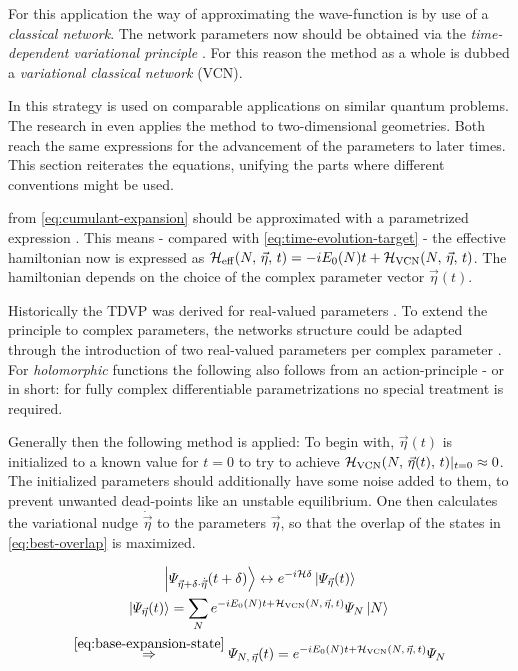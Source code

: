 For this application the way of approximating the wave-function is by use of a \emph{classical network}. 
The network parameters now should be obtained via the \emph{time-dependent variational principle} \cite{originalDerivationTimeDependendVariationalPrinciple}.
For this reason the method as a whole is dubbed a \emph{variational classical network} (VCN).

In \cite{variationalClassicalNetworksPaper} this strategy is used on comparable applications on similar quantum problems.
The research in \cite{probabilitySamplingRequirementVCN} even applies the method to two-dimensional geometries.
Both reach the same expressions for the advancement of the parameters to later times.
This section reiterates the equations, unifying the parts where different conventions might be used.

\HNOft from \autoref{eq:cumulant-expansion} should be approximated with a parametrized expression \HvcnOft{\vec{\eta}}.
This means - compared with \autoref{eq:time-evolution-target} - the effective hamiltonian now is expressed as $\HeffOft[N,\,\vec{\eta}] = -i E_0(N) t + \HvcnOft{\vec{\eta}}$.
The hamiltonian depends on the choice of the complex parameter vector $\vec{\eta}(t)$.

Historically the TDVP was derived for real-valued parameters \cite{originalDerivationTimeDependendVariationalPrinciple}.
To extend the principle to complex parameters, the networks structure could be adapted through the introduction of two real-valued parameters per complex parameter \cite{TDVPcomplexPrefactors}.
For \emph{holomorphic} functions the following also follows from an action-principle \cite{probabilitySamplingRequirementVCN} - or in short: for fully complex differentiable \cite{complexDifferentiation} parametrizations no special treatment is required.

Generally then the following method is applied: To begin with, $\vec{\eta}(t)$ is initialized to a known value for $t=0$ to try to achieve $\HvcnOft{\vec{\eta}(t)} \vert_{t=0} \approx 0$.
The initialized parameters should additionally have some noise added to them, to prevent unwanted dead-points like an unstable equilibrium.
One then calculates the variational nudge $\dot{\vec{\eta}}$ to the parameters $\vec{\eta}$, so that the overlap of the states in \autoref{eq:best-overlap} is maximized.

\begin{equation}
    \label{eq:best-overlap}
    \begin{gathered}
        \ketpsiEta{\vec{\eta} + \delta \cdot \dot{\vec{\eta}}}{t + \delta} \leftrightarrow e^{-i \hamiltonian \delta} \ketpsiEta{\vec{\eta}}{t}
        \\
        \ketpsiEta{\vec{\eta}}{t} = \lsum[N] e^{-i E_0(N) t + \HvcnOft{\vec{\eta}}} \psiN \ketN{}
        \\
        \stackrel{\ref{eq:base-expansion-state}}{\Rightarrow} \psiEta{N,\,\vec{\eta}}{t} = e^{-i E_0(N) t + \HvcnOft{\vec{\eta}}} \psiN
    \end{gathered}
\end{equation}

